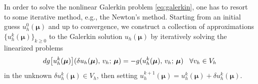 \documentclass[12pt, a4paper, twoside, openright]{report}
\numberwithin{equation}{chapter}
\theoremstyle{theorem}
\theoremstyle{definition}
\theoremstyle{remark}
\theoremstyle{proposition}
\numberwithin{figure}{chapter}
\newcommand{\bg}[1]{\boldsymbol{#1}}
\begin{document}
		In order to solve the nonlinear Galerkin problem \eqref{eq:galerkin}, one has to resort to some iterative method, e.g., the Newton's method. Starting from an initial guess $u_h^0(\bg{\mu})$ and up to convergence, we construct a collection of approximations $\big\lbrace u_h^k(\bg{\mu}) \big\rbrace_{k \geq 0}$ to the Galerkin solution $u_h(\bg{\mu})$ by iteratively solving the linearized problems
		\begin{equation}
			\label{eq:newton-linearized-problem}
			dg \big[ u_h^k(\bg{\mu}) \big](\delta u_h(\bg{\mu}), \, v_h; \, \bg{\mu}) = - g(u_h^k(\bg{\mu}), \, v_h; \, \bg{\mu}) \hspace*{0.3cm} \forall v_h \in V_h
		\end{equation}
		in the unknown $\delta u_h^k(\bg{\mu}) \in V_h$, then setting $u_h^{k+1}(\bg{\mu}) = u_h^k(\bg{\mu}) + \delta u_h^k(\bg{\mu})$. 
		
\end{document}
